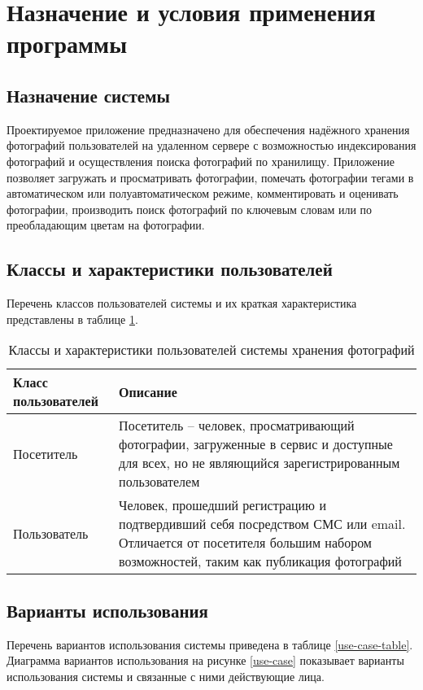 \section{Назначение и условия применения программы}
\subsection{Назначение системы}
Проектируемое приложение предназначено для обеспечения надёжного хранения фотографий пользователей на удаленном сервере с возможностью индексирования фотографий и осуществления поиска фотографий по хранилищу.
Приложение позволяет загружать и просматривать фотографии, помечать фотографии тегами в автоматическом или полуавтоматическом режиме, комментировать и оценивать фотографии, производить поиск фотографий по ключевым словам или по преобладающим цветам на фотографии.

\subsection{Классы и характеристики пользователей}

Перечень классов пользователей системы и их краткая характеристика представлены в таблице \ref{user-classes-table}.
\begin{table}[H]
  \caption{\onehalfspacing Классы и характеристики пользователей системы хранения фотографий}\label{user-classes-table}
  \begin{tabular}{|p{4cm}|p{12cm}|}
  \hline Класс пользователей & Описание \\ 
  \hline Посетитель & Посетитель – человек, просматривающий фотографии, загруженные в сервис и доступные для всех, но не являющийся зарегистрированным пользователем \\ 
  \hline Пользователь & Человек, прошедший регистрацию и подтвердивший себя посредством СМС или email. Отличается от посетителя большим набором возможностей, таким как публикация фотографий \\ 
  \hline
  \end{tabular}
\end{table}

\subsection{Варианты использования}
Перечень вариантов использования системы приведена в таблице \ref{use-case-table}.
Диаграмма вариантов использования на рисунке \ref{use-case} показывает варианты использования системы и связанные с ними действующие лица.


